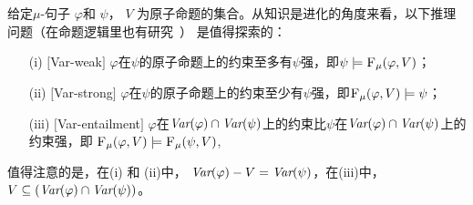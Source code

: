 给定$\mu$-句子 $\varphi$和 $\psi$， $V$ 为原子命题的集合。从知识是进化的角度来看，以下推理问题（在命题逻辑里也有研究~\cite{wang2015forgetting}） 是值得探索的：

\begin{itemize}
	\item[(i)] $[$Var-weak$]$ $\varphi$在$\psi$的原子命题上的约束至多有$\psi$强，即$\psi\models {\textsc{F}_{\textsc{$\mu$}}}(\varphi, V)$；
	\item[(ii)] $[$Var-strong$]$ $\varphi$在$\psi$的原子命题上的约束至少有$\psi$强，即${\textsc{F}_{\textsc{$\mu$}}}(\varphi, V)\models \psi$；
	\item[(iii)] $[$Var-entailment$]$ $\varphi$在$\textit{Var}(\varphi) \cap \textit{Var}(\psi)$上的约束比$\psi$在$\textit{Var}(\varphi) \cap \textit{Var}(\psi)$上的约束强，即 ${\textsc{F}_{\textsc{$\mu$}}}(\varphi, V) \models {\textsc{F}_{\textsc{$\mu$}}}(\psi, V)$,
\end{itemize}
值得注意的是，在(i) 和 (ii)中， $\textit{Var}(\varphi) - V = \textit{Var}(\psi)$，在(iii)中， $V \subseteq (\textit{Var}(\varphi) \cap \textit{Var}(\psi))$。

